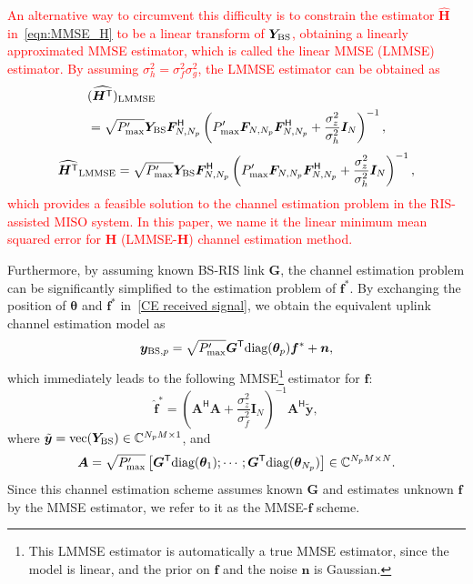 \documentclass[journal,twocolumn]{IEEEtran}
\theoremstyle{nonumberplain}
\def \T {\bm \Theta}
\def \diag {\text{diag}}
\def \T {^{\mathsf{T}}}
\def \H {^{\mathsf{H}}}
\newcommand{\red}[1]{\textcolor{red}{#1}}
\begin{document}
    \red{An alternative way to circumvent this difficulty is to constrain the estimator $\hat{\bm H}$ in~\eqref{eqn:MMSE_H} to be a linear transform of ${\bm Y}_{\rm BS}$, obtaining a linearly approximated MMSE estimator, which is called the linear MMSE (LMMSE) estimator. By assuming $\sigma_h^2 = \sigma_f^2\sigma_g^2$, the LMMSE estimator can be obtained as }
    \red{
    \ifx\onecol\undefined
        \begin{equation}
            \begin{aligned}
            & (\widehat{\bm{H}\T})_{\rm LMMSE} \\
            & = \sqrt{P'_{\rm max}} {\bm Y}_{\rm BS} {\bm F}_{N, N_p}\H \left( P'_{\rm max}{\bm F}_{N, N_p} {\bm F}_{N, N_p}\H + \frac{\sigma_z^2}{\sigma_h^2}{\bm I}_{N}  \right)^{-1},
            \end{aligned}
            \label{eqn:LMMSE}
        \end{equation}
    \else
        \begin{equation}
            \widehat{\bm{H}\T}_{\rm LMMSE} = \sqrt{P'_{\rm max}} {\bm Y}_{\rm BS} {\bm F}_{N, N_p}\H \left( P'_{\rm max}{\bm F}_{N, N_p} {\bm F}_{N, N_p}\H + \frac{\sigma_z^2}{\sigma_h^2}{\bm I}_{N}  \right)^{-1},
            \label{eqn:LMMSE}
        \end{equation}
    \fi
    }
    \red{which provides a feasible solution to the channel estimation problem in the RIS-assisted MISO system. In this paper, we name it the linear minimum mean squared error for $\bm H$ (LMMSE-$\bm H$) channel estimation method.} 

    Furthermore, by assuming known BS-RIS link $\bm G$, the channel estimation problem can be significantly simplified to the estimation problem of ${\bm f}^*$. By exchanging the position of ${\bm\theta}$ and ${\bm f}^*$ in~\eqref{CE received signal}, we obtain the equivalent uplink channel estimation model as 
    \begin{equation}
        {\bm y}_{{\rm BS}, p} = \sqrt{P'_{\rm max}} {\bm G}\T \diag({\bm \theta}_p) {\bm f}^* + {\bm n}, 
    \end{equation} 
    which immediately leads to the following MMSE\footnote{This LMMSE estimator is automatically a true MMSE estimator, since the model is linear, and the prior on $\bm f$ and the noise $\bm n$ is Gaussian. } estimator for $\bm f$:
    \begin{equation}
        \hat{\bm f}^* = \left( {\bm A}\H{\bm A} + \frac{\sigma_z^2}{\sigma_f^2}{\bm I}_N \right)^{-1} {\bm A}\H \tilde{\bm y},
    \end{equation}
    where $\tilde{\bm y} = {\rm vec}({\bm Y}_{\rm BS})\in\mathbb{C}^{N_pM\times 1}$, and 
    \begin{equation}
        {\bm A} = \sqrt{P'_{\rm max}}\left[ {\bm G}\T\diag({\bm \theta}_1);\cdots;  {\bm G}\T\diag({\bm \theta}_{N_p})\right] \in \mathbb{C}^{N_pM\times N}.
    \end{equation}
    Since this channel estimation scheme assumes known $\bm G$ and estimates unknown $\bm f$ by the MMSE estimator, we refer to it as the MMSE-$\bm f$ scheme. 
\end{document}
